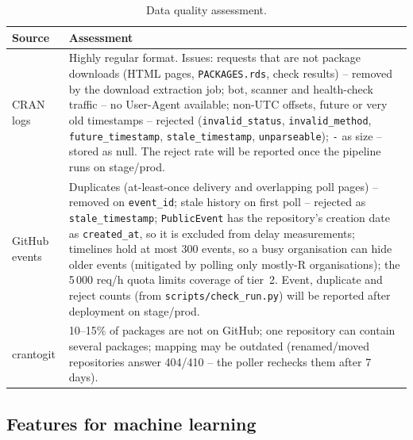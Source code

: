 \documentclass[11pt,a4paper]{article}
\begin{document}
\begin{table}[H]
\centering
\caption{Data quality assessment.}
\small
\begin{tabularx}{\textwidth}{@{}L{2.6cm}Y@{}}
\toprule
\textbf{Source} & \textbf{Assessment} \\
\midrule
CRAN logs &
  Highly regular format. Issues: requests that are not package downloads (HTML pages, \texttt{PACKAGES.rds}, check results)
  -- removed by the download extraction job; bot, scanner and health-check traffic -- no User-Agent available;
  non-UTC offsets, future or very old timestamps -- rejected (\texttt{invalid\_\allowbreak{}status}, \texttt{invalid\_\allowbreak{}method},
  \texttt{future\_\allowbreak{}timestamp}, \texttt{stale\_\allowbreak{}timestamp}, \texttt{unparseable}); \texttt{-} as size -- stored as null.
  The reject rate will be reported once the pipeline runs on stage/prod. \\
GitHub events &
  Duplicates (at-least-once delivery and overlapping poll pages) -- removed on \texttt{event\_\allowbreak{}id}; stale history on first poll --
  rejected as \texttt{stale\_\allowbreak{}timestamp}; \texttt{PublicEvent} has the repository's creation date as \texttt{created\_\allowbreak{}at},
  so it is excluded from delay measurements; timelines hold at most 300 events, so a busy organisation can
  hide older events (mitigated by polling only mostly-R organisations); the 5\,000 req/h quota limits coverage of tier~2.
  Event, duplicate and reject counts (from \texttt{scripts/check\_\allowbreak{}run.py}) will be reported after deployment on stage/prod. \\
crantogit &
  10--15\% of packages are not on GitHub; one repository can contain several packages; mapping may be outdated
  (renamed/moved repositories answer 404/410 -- the poller rechecks them after 7 days). \\
\bottomrule
\end{tabularx}
\end{table}

\subsection{Features for machine learning}
\end{document}
